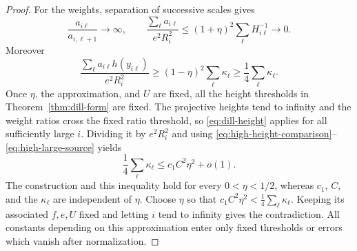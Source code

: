 \begin{proof}
For the weights, separation of successive scales gives
\[
 \frac{a_{i\ell}}{a_{i,\ell+1}}\longrightarrow\infty,
 \qquad
 \frac{\sum_\ell a_{i\ell}}{e^2R_i^2}
       \le (1+\eta)^2\sum_\ell H_{i\ell}^{-1}\longrightarrow0.
\]
Moreover
\begin{equation}\label{eq:high-large-source}
 \frac{\sum_\ell a_{i\ell}h(y_{i\ell})}{e^2R_i^2}
       \ge(1-\eta)^2\sum_\ell\kappa_\ell
       \ge\frac14\sum_\ell\kappa_\ell.
\end{equation}
Once $\eta$, the approximation, and $U$ are fixed, all the height
thresholds in Theorem~\ref{thm:dill-form} are fixed.  The projective
heights tend to infinity and the weight ratios cross the fixed ratio
threshold, so \eqref{eq:dill-height} applies for all sufficiently
large $i$.  Dividing it by $e^2R_i^2$ and using
\eqref{eq:high-height-comparison}--\eqref{eq:high-large-source} yields
\[
 \frac14\sum_\ell\kappa_\ell
       \le c_1 C^2\eta^2+o(1).
\]
The construction and this inequality hold for every $0<\eta<1/2$,
whereas $c_1$, $C$, and the $\kappa_\ell$ are independent of $\eta$.
Choose $\eta$ so that $c_1C^2\eta^2<\frac14\sum_\ell\kappa_\ell$.
Keeping its associated $f,e,U$ fixed and letting $i$ tend to infinity
gives the contradiction.  All constants depending on this approximation
enter only fixed thresholds or errors which vanish after normalization.
\end{proof}
